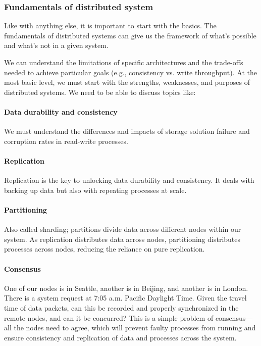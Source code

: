 \subsubsection{Fundamentals of distributed system}\label{PKCzJ8uMmQpxBqvnVoddk}

Like with anything else, it is important to start with the basics. The fundamentals of distributed systems can give us the framework of what's possible and what's not in a given system.

We can understand the limitations of specific architectures and the trade-offs needed to achieve particular goals (e.g., consistency vs. write throughput). At the most basic level, we must start with the strengths, weaknesses, and purposes of distributed systems. We need to be able to discuss topics like:

\paragraph{Data durability and consistency}\label{iHwKHOH3Na9dIlJQHakjJ}

We must understand the differences and impacts of storage solution failure and corruption rates in read-write processes.

\paragraph{Replication}\label{zZc2L079kvHI0bXWlCpGQ}

Replication is the key to unlocking data durability and consistency. It deals with backing up data but also with repeating processes at scale.

\paragraph{Partitioning}\label{zghAEVLGuomGBtE2nf5S3}

Also called sharding; partitions divide data across different nodes within our system. As replication distributes data across nodes, partitioning distributes processes across nodes, reducing the reliance on pure replication.

\paragraph{Consensus}\label{dOF9E5f97ZsQ5pfhYB8LW}

One of our nodes is in Seattle, another is in Beijing, and another is in London. There is a system request at 7:05 a.m. Pacific Daylight Time. Given the travel time of data packets, can this be recorded and properly synchronized in the remote nodes, and can it be concurred? This is a simple problem of consensus---all the nodes need to agree, which will prevent faulty processes from running and ensure consistency and replication of data and processes across the system.

